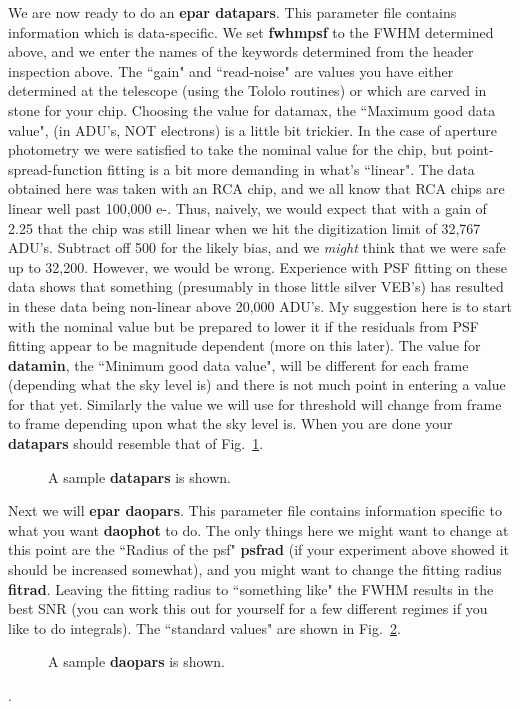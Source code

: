 We are now ready to do an {\bf epar datapars}.  This parameter file
contains information which is data-specific.  We set {\bf fwhmpsf} to the FWHM
determined above, and we enter the names of the keywords determined from
the header inspection above.  The ``gain" and ``read-noise" are values
you have either determined at the telescope (using the Tololo routines)
or which are carved in stone for your chip.  Choosing the value
for datamax, the ``Maximum good data value",
(in ADU's, NOT electrons) is a little bit trickier.  In the case of
aperture photometry we were satisfied to take the nominal value for
the chip, but point-spread-function fitting is a bit more demanding
in what's ``linear".  The data obtained
here was taken with an RCA chip, and we all know that RCA chips are
linear well past 100,000 e-.  Thus, naively, we would expect that
with a gain of 2.25 that the chip was still linear when we hit the
digitization limit of 32,767 ADU's.  Subtract off 500 for the likely
bias, and we {\it might} think that we were safe up to 32,200.  However,
we would be wrong.  Experience with PSF fitting on these data shows that
something (presumably in those little silver VEB's) has resulted in
these data being non-linear above 20,000 ADU's.  My suggestion here is
to start with the nominal value but be prepared to lower it if the
residuals from PSF fitting appear to be magnitude dependent (more on this
later).  The value for
{\bf datamin}, the
``Minimum good
data value", will be different for each frame (depending what the sky
level is) and there is not much point in entering a value for that yet.
Similarly the value we will use for threshold will change
from frame to frame depending upon what the sky level is.
When you are done your {\bf datapars} should resemble that of
Fig.~\ref{datapars}.
\begin{figure}
\vspace{2.7in}
\caption{\label{datapars} A sample {\bf datapars} is shown.}
\end{figure}
 
Next we will {\bf epar daopars}.  This parameter file contains
information specific to what you want {\bf daophot} to do.  The only things here
we might want to change at this point are the ``Radius of the psf" {\bf psfrad}
(if your experiment above showed it should be increased somewhat), and
you might want to change the fitting radius {\bf fitrad}.  Leaving the fitting
radius to ``something like" the FWHM results in the best SNR (you can
work this out for yourself for a few different regimes if you like to
do integrals).  The ``standard values" are shown in Fig.~\ref{daopars}.
\begin{figure}
\vspace{2.7in}
\caption{\label{daopars} A sample {\bf daopars} is shown.}
\end{figure}.
 
